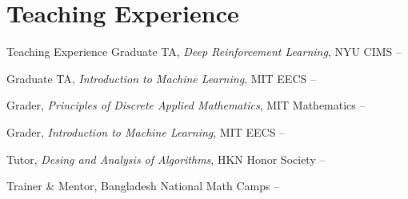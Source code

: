 
\section{Teaching Experience}{Teaching Experience}
Graduate TA, \textit{Deep Reinforcement Learning}, NYU CIMS
\hfill 
{} -- 
\par
  Graduate TA, \textit{Introduction to Machine Learning}, MIT EECS
\hfill 
{} -- 
 \par
Grader, \textit{Principles of Discrete Applied Mathematics}, MIT Mathematics 
\hfill 
{} -- 
 \par
Grader, \textit{Introduction to Machine Learning}, MIT EECS 
\hfill 
{} -- 
 \par
 Tutor, \textit{Desing and Analysis of Algorithms}, HKN Honor Society 
\hfill 
{} -- 
 \par
Trainer \& Mentor, Bangladesh National Math Camps
\hfill 
{} -- 